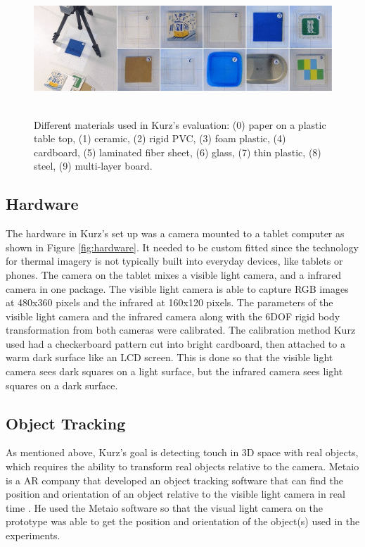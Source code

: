 \documentclass{sig-alternate}
\begin{document}
\begin{figure}
	\includegraphics[width=18cm, height=5cm]{ThermalTesting}
	\caption{Different materials used in Kurz's evaluation: (0) paper on a plastic table top, (1) ceramic, (2) rigid PVC, (3) foam plastic, (4) cardboard, (5) laminated fiber sheet, (6) glass, (7) thin plastic, (8) steel, (9) multi-layer board. \cite{Thermal}}
	\label{fig:ThermalTest}
\end{figure}

\subsection{Hardware}
\label{Hardware}
The hardware in Kurz's \cite{Thermal} set up was a camera mounted to a tablet computer as shown in Figure \ref{fig:hardware}. It needed to be custom fitted since the technology for thermal imagery is not typically built into everyday devices, like tablets or phones. The camera on the tablet mixes a visible light camera, and a infrared camera in one package. The visible light camera is able to capture RGB images at 480x360 pixels and the infrared at 160x120 pixels. The parameters of the visible light camera and the infrared camera along with the 6DOF rigid body transformation from both cameras were calibrated. The calibration method Kurz used had a checkerboard pattern cut into bright cardboard, then attached to a warm dark surface like an LCD screen. This is done so that the visible light camera sees dark squares on a light surface, but the infrared camera sees light squares on a dark surface.


\subsection{Object Tracking}
\label{Object Tracking}
As mentioned above,  Kurz's goal is detecting touch in 3D space with real objects, which requires the ability to transform real objects relative to the camera. Metaio is a AR company that developed an object tracking software that can find the position and orientation of an object relative to the visible light camera in real time \cite{Thermal}. He used the Metaio software so that the visual light camera on the prototype was able to get the position and orientation of the object(s) used in the experiments.    
\end{document}

